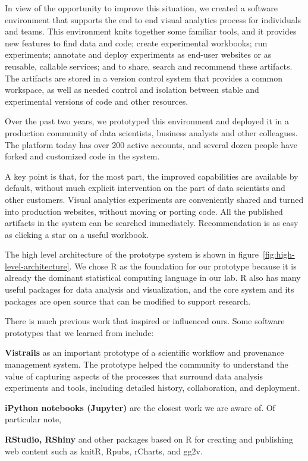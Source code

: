 In view of the opportunity to improve this situation,
we created a software environment that supports the end to end
visual analytics process for individuals and teams.
This environment knits together some familiar tools, and it
provides new features to find data and code; create experimental workbooks;
run experiments; annotate and deploy experiments as end-user websites or
as reusable, callable services; and to share, search and recommend these artifacts. The artifacts are stored in a version
control system that provides a common workspace, as well as needed control
and isolation between stable and experimental versions of code and other
resources. 

Over the past two years, we prototyped this environment and deployed it
in a production community of data scientists, business analysts and other colleagues.
The platform today has over 200 active accounts, and several dozen people have forked
and customized code in the system.

A key point is that, for the most part, the improved capabilities are
available by default, without much explicit intervention on the part of
data scientists and other customers. Visual analytics experiments are
conveniently shared and turned into production websites, without moving
or porting code. All the published artifacts in the system can be
searched immediately. Recommendation is as easy as clicking a star
on a useful workbook.

The high level architecture of the prototype system
is shown in figure~\ref{fig:high-level-architecture}.
We chose R as the foundation for our prototype because it is already
the dominant statistical computing language in our lab.
R also has many useful packages for data analysis and visualization,
and the core system and its packages are open source that can be modified to
support research. 

There is much previous work that inspired or influenced ours. Some
software prototypes that we learned from include:

{\bf Vistrails} as an important prototype of a scientific workflow
and provenance management system. The prototype helped the community
to understand the value of capturing aspects of the processes that
surround data analysis experiments and tools, including detailed
history, collaboration, and deployment.

{\bf iPython notebooks (Jupyter)} are the closest work we are aware of.
Of particular note, 

{\bf RStudio, RShiny} and other packages based on R for creating and
publishing web content such as knitR, Rpubs, rCharts, and gg2v.


